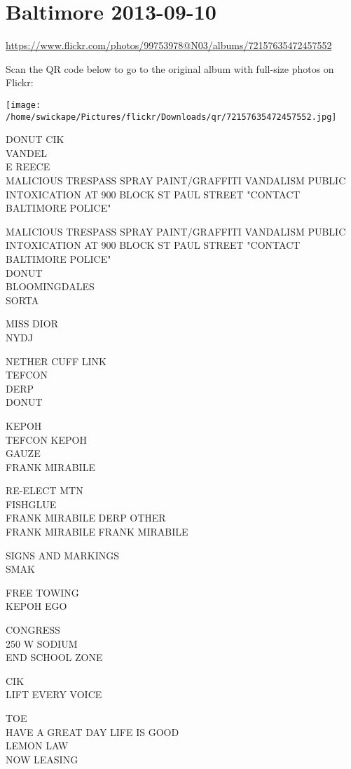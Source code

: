 \documentclass[10pt,letterpaper]{article}
\begin{document}
\section*{Baltimore 2013-09-10}

\url{https://www.flickr.com/photos/99753978@N03/albums/72157635472457552}

Scan the QR code below to go to the original album with full-size photos on Flickr:

\texttt{[image: /home/swickape/Pictures/flickr/Downloads/qr/72157635472457552.jpg]}


DONUT CIK\\
VANDEL\\
E REECE\\
MALICIOUS TRESPASS SPRAY PAINT/GRAFFITI VANDALISM PUBLIC INTOXICATION AT 900 BLOCK ST PAUL STREET "CONTACT BALTIMORE POLICE"

MALICIOUS TRESPASS SPRAY PAINT/GRAFFITI VANDALISM PUBLIC INTOXICATION AT 900 BLOCK ST PAUL STREET "CONTACT BALTIMORE POLICE"\\
DONUT\\
BLOOMINGDALES\\
SORTA

MISS DIOR\\
NYDJ

NETHER CUFF LINK\\
TEFCON\\
DERP\\
DONUT

KEPOH\\
TEFCON KEPOH\\
GAUZE\\
FRANK MIRABILE

RE{-}ELECT MTN\\
FISHGLUE\\
FRANK MIRABILE DERP OTHER\\
FRANK MIRABILE FRANK MIRABILE

SIGNS AND MARKINGS\\
SMAK

FREE TOWING\\
KEPOH EGO

CONGRESS\\
250 W SODIUM\\
END SCHOOL ZONE

CIK\\
LIFT EVERY VOICE

TOE\\
HAVE A GREAT DAY LIFE IS GOOD\\
LEMON LAW\\
NOW LEASING
\end{document}
